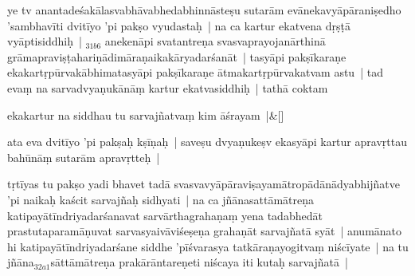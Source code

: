 \documentclass[article,12pt,a4paper]{memoir}%
\newcounter{parCount}
\begin{document}
	  
	  \pstart \leavevmode%
	\label{thakur75-56.5}ye tv anantadeśakālasvabhāvabhedabhinnāsteṣu sutarām evānekavyāpāraniṣedho 'sambhavīti dvitīyo 'pi pakṣo vyudastaḥ | na ca kartur ekatvena dṛṣṭā vyāptisiddhiḥ | {\tiny $_{31b6}$} anekenāpi svatantreṇa svasvaprayojanārthinā grāmapraviṣṭahariṇādimāraṇaikakāryadarśanāt | tasyāpi pakṣīkaraṇe ekakartṛpūrvakābhimatasyāpi pakṣīkaraṇe ātmakartṛpūrvakatvam astu | tad evaṃ na sarvadvyaṇukānāṃ kartur ekatvasiddhiḥ | \label{ratnakīrtinibandhāvali__36r1NMMFX7IAGR5V3DIY9Q16BLF}tathā coktam
	{}
	\pend%
      
	    
	    \stanza[\smallbreak]
	  \label{ratnakīrtinibandhāvali__36r1NMFLFX785HFFPE2O9XY3QCP}ekakartur na siddhau tu sarvajñatvaṃ kim āśrayam |\label{ratnakīrtinibandhāvali__36r1NMFLNZF26QG3OB18MFYZVHQ}\&[\smallbreak]
	  
	  
	  

	  
	  \pstart \leavevmode%
	\label{thakur75-56.11}ata eva dvitīyo 'pi pakṣaḥ kṣīṇaḥ | saveṣu dvyaṇukeṣv ekasyāpi kartur apravṛttau bahūnāṃ sutarām apravṛtteḥ |
	{}
	\pend%
      

	  
	  \pstart \leavevmode%
	\label{thakur75-56.13}tṛ\leavevmode{}\label{RNAms_32a}tīyas tu pakṣo yadi bhavet tadā svasvavyāpāraviṣayamātropādānādyabhijñatve 'pi naikaḥ kaścit sarvajñaḥ sidhyati | na ca \label{rnā__151710}jñānasattāmātreṇa\label{rnā__151759} katipayātīndriyadarśanavat sarvārthagrahaṇaṃ yena tadabhedāt prastutaparamāṇuvat sarvasyaivāviśeṣeṇa grahaṇāt sarvajñatā syāt | anumānato hi katipayātīndriyadarśane siddhe 'pīśvarasya tatkāraṇayogitvaṃ niścīyate | na tu jñāna{\tiny $_{32a1}$}sāttāmātreṇa prakārāntareṇeti niścaya iti kutaḥ sarvajñatā |
	{}
	\pend%
      
\end{document}
